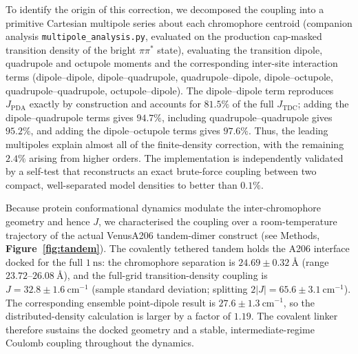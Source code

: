 \documentclass[journal=jpcbfk, manuscript=article, layout=twocolumn, doi=true]{achemso}
\begin{document}
To identify the origin of this correction, we decomposed the coupling into a primitive Cartesian multipole series about each chromophore centroid (companion analysis \texttt{multipole\_analysis.py}, evaluated on the production cap-masked transition density of the bright $\pi\pi^{*}$ state), evaluating the transition dipole, quadrupole and octupole moments and the corresponding inter-site interaction terms (dipole--dipole, dipole--quadrupole, quadrupole--dipole, dipole--octupole, quadrupole--quadrupole, octupole--dipole). The dipole--dipole term reproduces $J_{\text{PDA}}$ exactly by construction and accounts for $81.5\%$ of the full $J_{\text{TDC}}$; adding the dipole--quadrupole terms gives $94.7\%$, including quadrupole--quadrupole gives $95.2\%$, and adding the dipole--octupole terms gives $97.6\%$. Thus, the leading multipoles explain almost all of the finite-density correction, with the remaining $2.4\%$ arising from higher orders. The implementation is independently validated by a self-test that reconstructs an exact brute-force coupling between two compact, well-separated model densities to better than $0.1\%$.

Because protein conformational dynamics modulate the inter-chromophore geometry and hence $J$, we characterised the coupling over a room-temperature trajectory of the actual VenusA206 tandem-dimer construct (see Methods, \textbf{Figure~\ref{fig:tandem}}). The covalently tethered tandem holds the A206 interface docked for the full $1~\mathrm{ns}$: the chromophore separation is $24.69 \pm 0.32~\text{\AA}$ (range $23.72$--$26.08~\text{\AA}$), and the full-grid transition-density coupling is $J = 32.8 \pm 1.6~\mathrm{cm^{-1}}$ (sample standard deviation; splitting $2|J| = 65.6 \pm 3.1~\mathrm{cm^{-1}}$). The corresponding ensemble point-dipole result is $27.6 \pm 1.3~\mathrm{cm^{-1}}$, so the distributed-density calculation is larger by a factor of $1.19$. The covalent linker therefore sustains the docked geometry and a stable, intermediate-regime Coulomb coupling throughout the dynamics.
\end{document}

